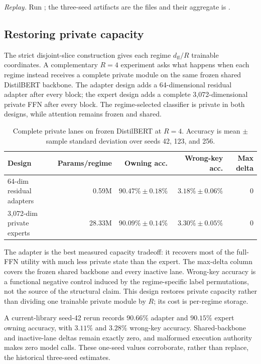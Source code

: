 \documentclass[11pt]{article}
\begin{document}
\noindent\textit{Replay.} Run
; the three-seed artifacts are
the  files and their
aggregate is .

\subsection{Restoring private capacity}

The strict disjoint-slice construction gives each regime
$d_{\mathrm{ff}}/R$ trainable coordinates. A complementary $R=4$ experiment
asks what happens when each regime instead receives a complete private module
on the same frozen shared DistilBERT backbone. The adapter design adds a
64-dimensional residual adapter after every block; the expert design adds a
complete 3,072-dimensional private FFN after every block. The regime-selected
classifier is private in both designs, while attention remains frozen and
shared.

\begin{table}[ht]
\centering
\caption{Complete private lanes on frozen DistilBERT at $R=4$. Accuracy is mean
$\pm$ sample standard deviation over seeds 42, 123, and 256.}
\label{tab:private-lanes}
\small
\begin{tabular}{@{}lrrrr@{}}
\toprule
Design & Params/regime & Owning acc. & Wrong-key acc. & Max delta \\
\midrule
64-dim residual adapters & 0.59M & $90.47\%\pm0.18\%$ &
$3.18\%\pm0.06\%$ & 0 \\
3,072-dim private experts & 28.33M & $90.09\%\pm0.14\%$ &
$3.30\%\pm0.05\%$ & 0 \\
\bottomrule
\end{tabular}
\end{table}

The adapter is the best measured capacity tradeoff: it recovers most of the
full-FFN utility with much less private state than the expert. The max-delta
column covers the frozen shared backbone and every inactive lane. Wrong-key
accuracy is a functional negative control induced by the regime-specific label
permutations, not the source of the structural claim. This design restores
private capacity rather than dividing one trainable private module by $R$; its
cost is per-regime storage.

A current-library seed-42 rerun records $90.66\%$ adapter and $90.15\%$
expert owning accuracy, with $3.11\%$ and $3.28\%$ wrong-key accuracy.
Shared-backbone and inactive-lane deltas remain exactly zero, and malformed
execution authority makes zero model calls. These one-seed values corroborate,
rather than replace, the historical three-seed estimates.
\end{document}
